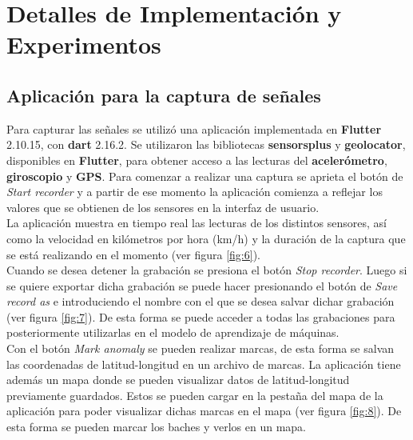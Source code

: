 \chapter{Detalles de Implementación y Experimentos}\label{chapter:implementation}

\section{Aplicación para la captura de señales}
	Para capturar las señales se utilizó una aplicación implementada en \textbf{Flutter} 2.10.15, con \textbf{dart} 2.16.2.
	Se utilizaron las bibliotecas \textbf{sensors\textunderscore plus} y \textbf{geolocator}, disponibles en \textbf{Flutter}, para obtener acceso
	a las lecturas del \textbf {acelerómetro}, \textbf{giroscopio} y \textbf{GPS}. Para comenzar a realizar una captura se aprieta el botón
	de \emph{Start recorder} y a partir de ese momento la aplicación comienza a reflejar los valores que se obtienen de los sensores en la
	interfaz de usuario.\\
	\indent La aplicación muestra en tiempo real las lecturas de los distintos sensores, así como la velocidad en kilómetros por hora (km/h) y la
	duración de la captura que se está realizando en el momento (ver figura \ref{fig:6}).\\
	\indent Cuando se desea detener la grabación se presiona el botón \emph{Stop recorder}. Luego si se quiere exportar dicha grabación se puede
	hacer presionando el botón de \emph{Save record as} e introduciendo el nombre con el que se desea salvar dichar grabación (ver figura
	\ref{fig:7}). De esta forma se puede acceder a todas las grabaciones para posteriormente utilizarlas en el modelo de aprendizaje de máquinas.\\
	\indent Con el botón \emph{Mark anomaly} se pueden realizar marcas, de esta forma se salvan las coordenadas de latitud-longitud en un
	archivo de marcas. La aplicación tiene además un mapa donde se pueden visualizar datos de latitud-longitud previamente guardados.
	Estos se pueden cargar en la pestaña del mapa de la aplicación para poder visualizar dichas marcas en el mapa (ver figura \ref{fig:8}).
	De esta forma se pueden marcar los baches y verlos en un mapa.\\
	
